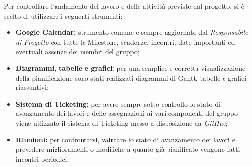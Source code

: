 Per controllare l'andamento del lavoro e delle attività previste dal progetto, si è scelto di utilizzare i seguenti strumenti:
\begin{itemize}
	\item \textbf{Google Calendar:} strumento comune e sempre aggiornato dal \textit{Responsabile di Progetto} con tutte le Milestone, scadenze, incontri, date importanti ed eventuali assenze dei membri del gruppo;
	\item \textbf{Diagrammi, tabelle e grafici:} per una semplice e corretta visualizzazione della pianificazione sono stati realizzati diagrammi di Gantt, tabelle e grafici riassuntivi;
	\item \textbf{Sistema di Ticketing:} per avere sempre sotto controllo lo stato di avanzamento dei lavori e delle assegnazioni ai vari componenti del gruppo viene utlizzato il sistema di Ticketing messo a disposizione da \textit{GitHub};
	\item \textbf{Riunioni:} per confrontarsi, valutare lo stato di avanzamento dei lavori e prevedere miglioramenti o modifiche a quanto già pianificato vengono fatti incontri periodici. 
\end{itemize}
